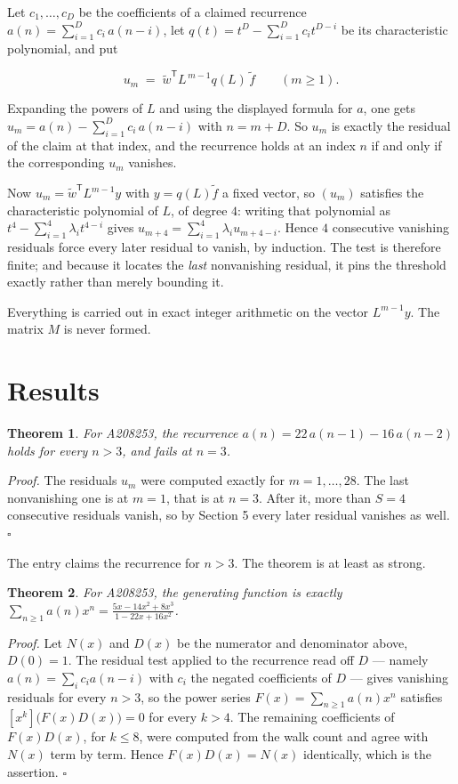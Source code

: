 \documentclass[11pt]{article}
\newtheorem{theorem}{Theorem}
\theoremstyle{definition}
\begin{document}
Let $c_1,\dots,c_D$ be the coefficients of a claimed recurrence $a(n) = \sum_{i=1}^{D} c_i\,a(n-i)$, let $q(t) = t^{D} - \sum_{i=1}^{D} c_i t^{D-i}$ be its characteristic polynomial, and put

\[u_m \;=\; \tilde w^{\mathsf T} L^{\,m-1} q(L)\,\tilde f \qquad (m \ge 1).\]

Expanding the powers of $L$ and using the displayed formula for $a$, one gets $u_m = a(n) - \sum_{i=1}^{D} c_i\,a(n-i)$ with $n = m + D$. So $u_m$ is exactly the residual of the claim at that index, and the recurrence holds at an index $n$ if and only if the corresponding $u_m$ vanishes.

Now $u_m = \tilde w^{\mathsf T} L^{m-1} y$ with $y = q(L)\tilde f$ a fixed vector, so $(u_m)$ satisfies the characteristic polynomial of $L$, of degree $4$: writing that polynomial as $t^{4} - \sum_{i=1}^{4} \lambda_i t^{4-i}$ gives $u_{m+4} = \sum_{i=1}^{4} \lambda_i u_{m+4-i}$. Hence $4$ consecutive vanishing residuals force every later residual to vanish, by induction. The test is therefore finite; and because it locates the {\itshape last} nonvanishing residual, it pins the threshold exactly rather than merely bounding it.

Everything is carried out in exact integer arithmetic on the vector $L^{m-1}y$. The matrix $M$ is never formed.

\section{Results}

\begin{theorem} For A208253, the recurrence $a(n) = 22\,a(n-1) - 16\,a(n-2)$ holds for every $n > 3$, and fails at $n = 3$.\end{theorem}

{\itshape Proof.} The residuals $u_m$ were computed exactly for $m = 1,\dots,28$. The last nonvanishing one is at $m = 1$, that is at $n = 3$. After it, more than $S = 4$ consecutive residuals vanish, so by Section 5 every later residual vanishes as well. $\square$

The entry claims the recurrence for $n > 3$. The theorem is at least as strong.

\begin{theorem} For A208253, the generating function is exactly $\sum_{n\ge 1} a(n)x^n = \frac{5x - 14x^{2} + 8x^{3}}{1 - 22x + 16x^{2}}$.\end{theorem}

{\itshape Proof.} Let $N(x)$ and $D(x)$ be the numerator and denominator above, $D(0)=1$. The residual test applied to the recurrence read off $D$ --- namely $a(n) = \sum_i c_i a(n-i)$ with $c_i$ the negated coefficients of $D$ --- gives vanishing residuals for every $n > 3$, so the power series $F(x)=\sum_{n\ge 1}a(n)x^n$ satisfies $[x^k]\bigl(F(x)D(x)\bigr) = 0$ for every $k > 4$. The remaining coefficients of $F(x)D(x)$, for $k \le 8$, were computed from the walk count and agree with $N(x)$ term by term. Hence $F(x)D(x) = N(x)$ identically, which is the assertion. $\square$
\end{document}
